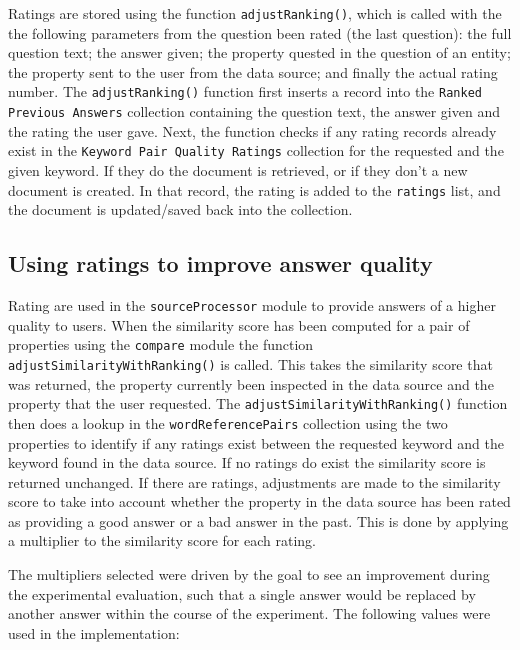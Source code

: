 \documentclass[authoryearcitations]{UoYCSproject}
\begin{document}
Ratings are stored using the function \texttt{adjustRanking()}, which is called with the the following parameters from the question been rated (the last question): the full question text; the answer given; the property quested in the question of an entity; the property sent to the user from the data source; and finally the actual rating number. The \texttt{adjustRanking()} function first inserts a record into the \texttt{Ranked Previous Answers} collection containing the question text, the answer given and the rating the user gave. Next, the function checks if any rating records already exist in the \texttt{Keyword Pair Quality Ratings} collection for the requested and the given keyword. If they do the document is retrieved, or if they don't a new document is created. In that record, the rating is added to the \texttt{ratings} list, and the document is updated/saved back into the collection.

\subsection{Using ratings to improve answer quality}
\label{subsec:usingRatings}

Rating are used in the \texttt{sourceProcessor} module to provide answers of a higher quality to users. When the similarity score has been computed for a pair of properties using the \texttt{compare} module the function \texttt{adjustSimilarityWithRanking()} is called. This takes the similarity score that was returned, the property currently been inspected in the data source and the property that the user requested. The \texttt{adjustSimilarityWithRanking()} function then does a lookup in the \texttt{wordReferencePairs} collection using the two properties to identify if any ratings exist between the requested keyword and the keyword found in the data source. If no ratings do exist the similarity score is returned unchanged. If there are ratings, adjustments are made to the similarity score to take into account whether the property in the data source has been rated as providing a good answer or a bad answer in the past. This is done by applying a multiplier to the similarity score for each rating. 

The multipliers selected were driven by the goal to see an improvement during the experimental evaluation, such that a single answer would be replaced by another answer within the course of the experiment. The following values were used in the implementation:
\end{document}
